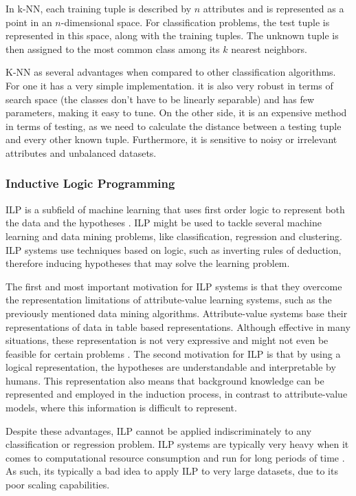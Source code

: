 In k-NN, each training tuple is described by $n$ attributes and is represented
as a point in an $n$-dimensional space. For classification problems, the test
tuple is represented in this space, along with the training tuples. The unknown
tuple is then assigned to the most common class among its $k$ nearest neighbors.

K-NN as several advantages when compared to other classification algorithms. For
one it has a very simple implementation. it is also very robust in terms of
search space (the classes don't have to be linearly separable) and has few
parameters, making it easy to tune. On the other side, it is an expensive method
in terms of testing, as we need to calculate the distance between a testing
tuple and every other known tuple. Furthermore, it is sensitive to noisy or
irrelevant attributes and unbalanced datasets.

\subsubsection*{Inductive Logic Programming}

ILP is a subfield of machine learning that uses first order logic to represent
both the data and the hypotheses \cite{Lavrac1998}. ILP might be used to tackle
several machine learning and data mining problems, like classification,
regression and clustering. ILP systems use techniques based on logic, such as
inverting rules of deduction, therefore inducing hypotheses that may solve the
learning problem.

The first and most important motivation for ILP systems is that they overcome
the representation limitations of attribute-value learning systems, such as the
previously mentioned data mining algorithms. Attribute-value systems base their
representations of data in table based representations. Although effective in
many situations, these representation is not very expressive and might not even
be feasible for certain problems \cite{Bratko:1995:AIL:219717.219771}. The
second motivation for ILP is that by using a logical representation, the
hypotheses are understandable and interpretable by humans. This representation
also means that background knowledge can be represented and employed in the
induction process, in contrast to attribute-value models, where this information
is difficult to represent.

Despite these advantages, ILP cannot be applied indiscriminately to any
classification or regression problem. ILP systems are typically very heavy when
it comes to computational resource consumption and run for long periods of time
\cite{fonseca2003implementation}. As such, its typically a bad idea to apply ILP
to very large datasets, due to its poor scaling capabilities.

